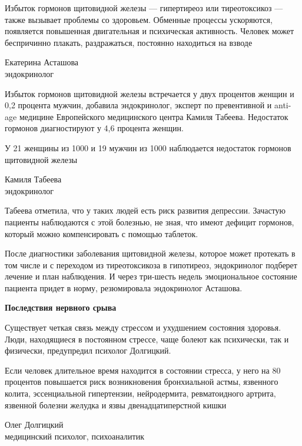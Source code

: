 \begin{fancyquotes}
    Избыток гормонов щитовидной железы — гипертиреоз или тиреотоксикоз — также вызывает проблемы со здоровьем. Обменные процессы ускоряются, появляется повышенная двигательная и психическая активность. Человек может беспричинно плакать, раздражаться, постоянно находиться на взводе\\

    \begin{flushright}
        Екатерина Асташова
        \\
        эндокринолог
    \end{flushright}
\end{fancyquotes}

Избыток гормонов щитовидной железы встречается у двух процентов женщин и 0,2 процента мужчин, добавила эндокринолог, эксперт по превентивной и anti-age медицине Европейского медицинского центра Камиля Табеева. Недостаток гормонов диагностируют у 4,6 процента женщин.

\begin{fancyquotes}
    У 21 женщины из 1000 и 19 мужчин из 1000 наблюдается недостаток гормонов щитовидной железы\\

    \begin{flushright}
        Камиля Табеева\\
        эндокринолог
    \end{flushright}
\end{fancyquotes}

Табеева отметила, что у таких людей есть риск развития депрессии. Зачастую пациенты наблюдаются с этой болезнью, не зная, что имеют дефицит гормонов, который можно компенсировать с помощью таблеток.

После диагностики заболевания щитовидной железы, которое может протекать в том числе и с переходом из тиреотоксикоза в гипотиреоз, эндокринолог подберет лечение и план наблюдения. И через три-шесть недель эмоциональное состояние пациента придет в норму, резюмировала эндокринолог Асташова.

\textbf{Последствия нервного срыва}

Существует четкая связь между стрессом и ухудшением состояния здоровья. Люди, находящиеся в постоянном стрессе, чаще болеют как психически, так и физически, предупредил психолог Долгицкий.

\begin{fancyquotes}
    Если человек длительное время находится в состоянии стресса, у него на 80 процентов повышается риск возникновения бронхиальной астмы, язвенного колита, эссенциальной гипертензии, нейродермита, ревматоидного артрита, язвенной болезни желудка и язвы двенадцатиперстной кишки\\

    \begin{flushright}
        Олег Долгицкий\\
        медицинский психолог, психоаналитик
    \end{flushright}
\end{fancyquotes}


